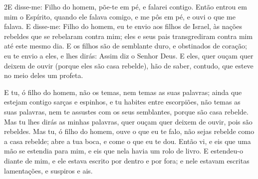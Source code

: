\medskip

\lettrine{2} E disse-me: Filho do homem, põe-te em pé, e
falarei contigo. Então entrou em mim o Espírito, quando ele
falava comigo, e me pôs em pé, e ouvi o que me falava. E
disse-me: Filho do homem, eu te envio aos filhos de Israel, às
nações rebeldes que se rebelaram contra mim; eles e seus pais
transgrediram contra mim até este mesmo dia. E os filhos são de
semblante duro, e obstinados de coração; eu te envio a eles, e lhes
dirás: Assim diz o Senhor Deus. E eles, quer ouçam quer deixem
de ouvir (porque eles são casa rebelde), hão de saber, contudo, que
esteve no meio deles um profeta.

E tu, ó filho do homem, não os temas, nem temas as suas palavras;
ainda que estejam contigo sarças e espinhos, e tu habites entre
escorpiões, não temas as suas palavras, nem te assustes com os seus
semblantes, porque são casa rebelde. Mas tu lhes dirás as minhas
palavras, quer ouçam quer deixem de ouvir, pois são rebeldes.
Mas tu, ó filho do homem, ouve o que eu te falo, não sejas
rebelde como a casa rebelde; abre a tua boca, e come o que eu te
dou. Então vi, e eis que uma mão se estendia para mim, e eis que
nela havia um rolo de livro. E estendeu-o diante de mim, e
ele estava escrito por dentro e por fora; e nele estavam escritas
lamentações, e suspiros e ais.

\medskip

